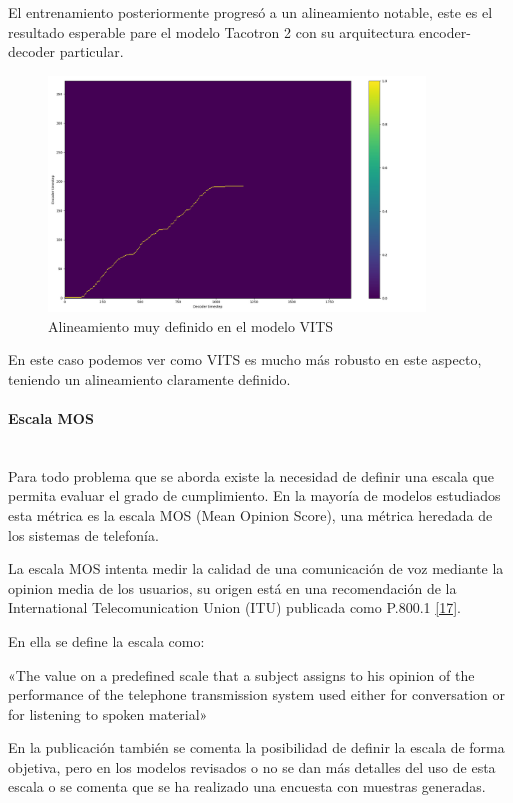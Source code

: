 El entrenamiento posteriormente progresó a un alineamiento notable, este es el resultado esperable pare el modelo Tacotron 2 con su arquitectura encoder-decoder particular.

\begin{figure}[H]
\centering
\includegraphics[width=10cm]{5_resultados_img/align-vits.png}
\caption{Alineamiento muy definido en el modelo VITS}
\label{fig:figure1}
\end{figure}

En este caso podemos ver como VITS es mucho más robusto en este aspecto, teniendo un alineamiento claramente definido.

\paragraph{Escala MOS} ~\\

Para todo problema que se aborda existe la necesidad de definir una escala que permita evaluar el grado de cumplimiento. En la mayoría de modelos estudiados esta métrica es la escala MOS (Mean Opinion Score), una métrica heredada de los sistemas de telefonía.

La escala MOS intenta medir la calidad de una comunicación de voz mediante la opinion media de los usuarios, su origen está en una recomendación de la International Telecomunication Union (ITU) publicada como P.800.1 \hyperref[RES_3]{[17]}.

En ella se define la escala como: 

\begin{displayquote}
«The value on a predefined scale that a subject assigns to his opinion of the performance of the telephone transmission system used either for conversation or for listening to spoken material»
\end{displayquote}

En la publicación también se comenta la posibilidad de definir la escala de forma objetiva, pero en los modelos revisados o no se dan más detalles del uso de esta escala o se comenta que se ha realizado una encuesta con muestras generadas.

